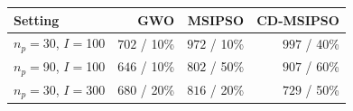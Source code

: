 \begin{tabular}{lrrr}
\hline
Setting & GWO & MSIPSO & CD-MSIPSO \\
\hline
$n_p{=}$30, $I{=}$100 & $702$ / 10\% & $972$ / 10\% & $997$ / 40\% \\
$n_p{=}$90, $I{=}$100 & $646$ / 10\% & $802$ / 50\% & $907$ / 60\% \\
$n_p{=}$30, $I{=}$300 & $680$ / 20\% & $816$ / 20\% & $729$ / 50\% \\
\hline
\end{tabular}